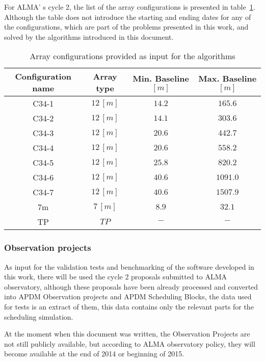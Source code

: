 For ALMA' s cycle 2, the list of the array configurations is presented in table~\ref{table:input-array-configs}. Although the table does not introduce the starting and ending dates for any of the configurations, which are part of the problems presented in this work, and solved by the algorithms introduced in this document.

\begin{table}[h!]
\begin{center}
\begin{tabular}{|c|c|c|c|}
\hline
\textbf{Configuration name} & \textbf{Array type} & \textbf{Min. Baseline $[m]$} & \textbf{Max. Baseline $[m]$}\\
\hline
C34-1 & $12\,[m]$ & $14.2$ & $165.6$ \\
\hline
C34-2 & $12\,[m]$ & $14.1$ & $303.6$ \\
\hline
C34-3 & $12\,[m]$ & $20.6$ & $442.7$ \\
\hline
C34-4 & $12\,[m]$ & $20.6$ & $558.2$ \\
\hline
C34-5 & $12\,[m]$ & $25.8$ & $820.2$ \\
\hline
C34-6 & $12\,[m]$ & $40.6$ & $1091.0$ \\
\hline
C34-7 & $12\,[m]$ & $40.6$ & $1507.9$ \\
\hline
7m    & $7\,[m]$  & $8.9$  & $32.1$ \\
\hline
TP    & $TP$      & $-$    & $-$ \\
\hline
\end{tabular}
\end{center}
\caption{Array configurations provided as input for the algorithms}
\label{table:input-array-configs}
\end{table}

\subsubsection{Observation projects}
As input for the validation tests and benchmarking of the software developed in this work, there will be used the cycle 2 proposals submitted to ALMA observatory, although these proposals have been already processed and converted into APDM Observation projects and APDM Scheduling Blocks, the data used for tests is an extract of them, this data contains only the relevant parts for the scheduling simulation.

At the moment when this document was written, the Observation Projects are not still publicly available, but according to ALMA observatory policy, they will become available at the end of 2014 or beginning of 2015. 

